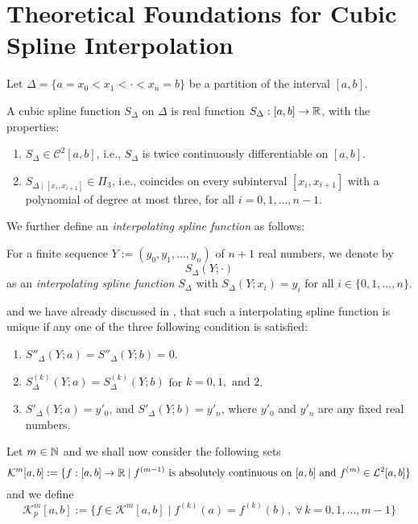 
\section{Theoretical Foundations for Cubic Spline Interpolation}

Let $\Delta = \{a = x_0 < x_1< \cdot < x_n = b\}$ be a partition of the interval $[a,b]$. 

\begin{defn}\label{defn1:mar25A}
    A cubic spline function $S_{\Delta}$ on $\Delta$ is real function $S_{\Delta} : [a,b] \to \mathbb{R}$, with the properties:
    \begin{enumerate}
        \item $S_{\Delta} \in \mathcal{C}^2[a,b]$, i.e., $S_{\Delta}$ is twice continuously differentiable on $[a,b]$. 
        \item $S_{\Delta \mid [x_i, x_{i+1}]} \in \Pi_3$, i.e., coincides on every subinterval $[x_i, x_{i+1}]$ with a polynomial of degree at most three, for all $i = 0,1,\dots,n-1$. 
    \end{enumerate}
\end{defn}

We further define an \textit{interpolating spline function} as follows:
\begin{defn}\label{defn2:mar25A}
    For a finite sequence $Y := (y_0, y_1, \dots, y_n)$ of $n+1$ real numbers, we denote by 
    \[
        S_{\Delta}(Y; \cdot)  
    \]
    as an \textit{interpolating spline function} $S_{\Delta}$ with $S_{\Delta}(Y; x_i) = y_i$ for all $ i \in \{0,1,\dots,n\}$.
\end{defn}

and we have already discussed in , that such a interpolating spline function is unique if any one of the three following condition is satisfied:

\begin{enumerate}[label = (\alph*)]
    \item
      $S''_\Delta(Y ; a) = S''_\Delta(Y ; b) = 0$.
    \item
      $S^{(k)}_\Delta(Y ; a) = S^{(k)}_\Delta(Y ; b)$ for $k = 0, 1, \text{ and } 2$.
    \item
      $S'_\Delta(Y ; a) = y'_0$, and $S'_\Delta(Y ; b) = y'_n$, where $y'_0$ and $y'_n$ are any fixed real numbers.
\end{enumerate}

Let $m \in \mathbb{N}$ and we shall now consider the following sets  
\begin{equation}\label{eq1:mar25A}
    \mathcal{K}^m[a,b] := \{ f : [a,b] \to \mathbb{R} \mid f^{(m-1)} \mbox{ is absolutely continuous on } [a,b] \mbox{ and } f^{(m)} \in \mathcal{L}^2[a,b] \}
\end{equation}
and we define 
\begin{equation}\label{eq2:mar25A}
    \mathcal{K}^m_p [a,b] := \{ f \in \mathcal{K}^m[a,b] \mid f^{(k)}(a) = f^{(k)}(b), \ \forall \, k = 0,1,\dots,m-1 \}
\end{equation}

